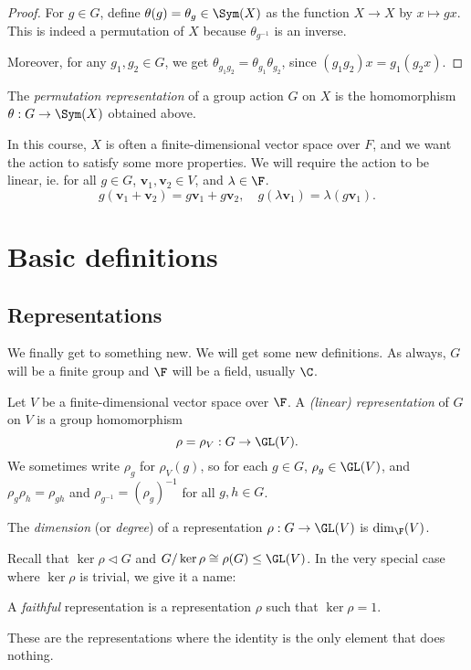 \documentclass[a4paper]{article}
\begin{document}
\begin{proof}
  For $g \in G$, define $\theta(g) = \theta_g \in \Sym (X)$ as the function $X \to X$ by $x \mapsto gx$. This is indeed a permutation of $X$ because $\theta_{g^{-1}}$ is an inverse.

  Moreover, for any $g_1, g_2 \in G$, we get $\theta_{g_1g_2} = \theta_{g_1} \theta_{g_2}$, since $(g_1g_2) x = g_1(g_2x)$.
\end{proof}

\begin{defi}
  The \emph{permutation representation} of a group action $G$ on $X$ is the homomorphism $\theta: G \to \Sym (X)$ obtained above.
\end{defi}

In this course, $X$ is often a finite-dimensional vector space over $F$, and we want the action to satisfy some more properties. We will require the action to be linear, ie. for all $g \in G$, $\mathbf{v}_1, \mathbf{v}_2 \in V$, and $\lambda \in \F$.
\[
  g(\mathbf{v}_1 + \mathbf{v}_2) = g \mathbf{v}_1 + g \mathbf{v}_2,\quad g(\lambda \mathbf{v}_1) = \lambda (g\mathbf{v}_1).
\]
\section{Basic definitions}
\subsection{Representations}
We finally get to something new. We will get some new definitions. As always, $G$ will be a finite group and $\F$ will be a field, usually $\C$.

\begin{defi}[Representation]
  Let $V$ be a finite-dimensional vector space over $\F$. A \emph{(linear) representation} of $G$ on $V$ is a group homomorphism
  \[
    \rho = \rho_V: G \to \GL(V).
  \]
  We sometimes write $\rho_g$ for $\rho_V(g)$, so for each $g \in G$, $\rho_g \in \GL(V)$, and $\rho_g \rho_h = \rho_{gh}$ and $\rho_{g^{-1}} = (\rho_g)^{-1}$ for all $g, h \in G$.
\end{defi}

\begin{defi}
  The \emph{dimension} (or \emph{degree}) of a representation $\rho: G \to \GL(V)$ is $\dim_\F(V)$.
\end{defi}

Recall that $\ker \rho \lhd G$ and $G/\ker \rho \cong \rho(G) \leq \GL(V)$. In the very special case where $\ker \rho$ is trivial, we give it a name:
\begin{defi}
  A \emph{faithful} representation is a representation $\rho$ such that $\ker \rho = 1$.
\end{defi}
These are the representations where the identity is the only element that does nothing.
\end{document}
